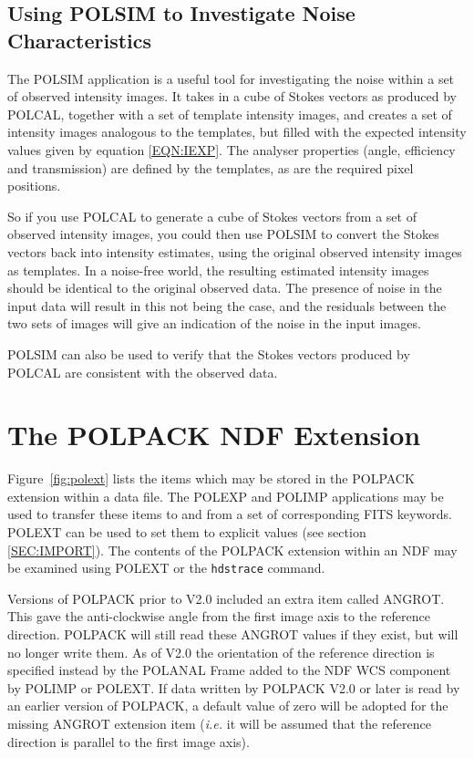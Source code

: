 \documentclass[twoside,11pt]{article}
\newcommand{\hyperref}[4]{#2\ref{#4}#3}
\newcommand{\htmlref}[2]{#1}
\newcommand{\xref}[3]{#1}
\newcommand{\xlabel}[1]{}
\renewcommand{\_}{\texttt{\symbol{95}}}
\begin{document}
\subsection{Using POLSIM to Investigate Noise Characteristics}
The \htmlref{POLSIM}{POLSIM} application is a useful tool for
investigating the noise within a set of observed intensity images. It
takes in a cube of Stokes vectors as produced by \htmlref{POLCAL}{POLCAL},
together with a set of template intensity images, and creates a set of
intensity images analogous to the templates, but filled with the expected
intensity values given by equation \ref{EQN:IEXP}. The analyser properties
(angle, efficiency and transmission) are defined by the templates, as are
the required pixel positions.

So if you use POLCAL to generate a cube of Stokes vectors from a set of 
observed intensity images, you could then use POLSIM to convert the
Stokes vectors back into intensity estimates, using the original observed
intensity images as templates. In a noise-free world, the resulting
estimated intensity images should be identical to the original observed
data. The presence of noise in the input data will result in this not
being the case, and the residuals between the two sets of images will
give an indication of the noise in the input images.

POLSIM can also be used to verify that the Stokes vectors produced by
POLCAL are consistent with the observed data.

\section{\label{APP:POLEXT}\xlabel{thepolpackndfextension}The POLPACK NDF Extension}

Figure~\ref{fig:polext} lists the items which may be stored in the
POLPACK extension within a data file. The \htmlref{POLEXP}{POLEXP} and
\htmlref{POLIMP}{POLIMP} applications may be used to transfer these items
to and from a set of corresponding FITS keywords. \htmlref{POLEXT}{POLEXT} 
can be used to set them to explicit values (see \hyperref{here}{section }
{}{SEC:IMPORT}). The contents of the POLPACK extension within an NDF may be 
examined using POLEXT or the \xref{\texttt{hdstrace}}{sun102}{} command.

Versions of POLPACK prior to V2.0 included an extra item called ANGROT.
This gave the anti-clockwise angle from the first image axis to the
reference direction. POLPACK will still read these ANGROT values if they exist,
but will no longer write them. As of V2.0 the orientation of the reference
direction is specified instead by the POLANAL Frame added to the NDF WCS
component by POLIMP or POLEXT. If data written by POLPACK V2.0 or later 
is read by an earlier version of POLPACK, a default value of zero will be
adopted for the missing ANGROT extension item (\emph{i.e.} it will be
assumed that the reference direction is parallel to the first image axis).
\end{document}
